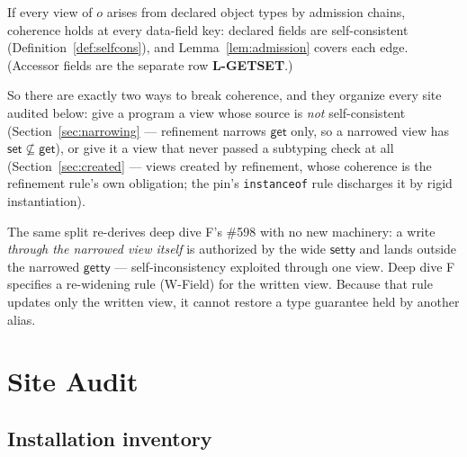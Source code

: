 \documentclass[11pt]{article}
\newcommand{\setty}{\mathsf{setty}}
\newcommand{\getty}{\mathsf{getty}}
\begin{document}
\begin{corollary}
\label{cor:declared}
If every view of $o$ arises from declared object types by admission
chains, coherence holds at every data-field key: declared fields are
self-consistent (Definition~\ref{def:selfcons}), and
Lemma~\ref{lem:admission} covers each edge. (Accessor fields are the
separate row \textbf{L-GETSET}.)
\end{corollary}

So there are exactly two ways to break coherence, and they organize
every site audited below: give a program a view whose source is
\emph{not} self-consistent (Section~\ref{sec:narrowing} — refinement
narrows $\mathsf{get}$ only, so a narrowed view has
$\mathsf{set} \not\subseteq \mathsf{get}$), or give it a view that never
passed a subtyping check at all (Section~\ref{sec:created} — views created
by refinement, whose coherence is the refinement rule's own obligation; the pin's
\texttt{instanceof} rule discharges it by rigid instantiation).

The same split re-derives deep dive F's \#598 with no new machinery: a
write \emph{through the narrowed view itself} is authorized by the wide
$\setty$ and lands outside the narrowed $\getty$ — self-inconsistency
exploited through one view. Deep dive F specifies a re-widening rule
(W-Field) for the written view. Because that rule updates only the written
view, it cannot restore a type guarantee held by another alias.

\section{Site Audit}
\label{sec:audit}

\subsection{Installation inventory}
\label{sec:inventory}
\end{document}
